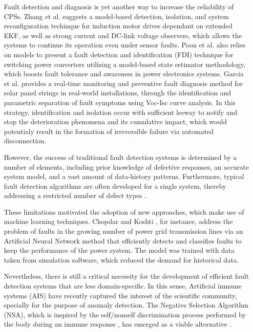 Fault detection and diagnosis is yet another way to increase the reliability of CPSs. Zhang et al. \cite{zhang2013sensor} suggests a model-based detection, isolation, and system reconfiguration techinque for induction motor drives dependant on extended EKF, as well as strong current and DC-link voltage observers, which allows the systems to continue its operation even under sensor faults. Poon et al. \cite{poon2016model} also relies on models to present a fault detection and identification (FDI) technique for switching power converters utilizing a model-based state estimator methodology, which boosts fault tolerance and awareness in power electronics systems. Garcia et al. \cite{garcia2022solar} provides a real-time monitoring and preventive fault diagnosis method for solar panel strings in real-world installations, through the identification and parametric separation of fault symptoms using Voc-Isc curve analysis. In this strategy, identification and isolation occur with sufficient leeway to notify and stop the deterioration phenomena and its cumulative impact, which would potentialy result in the formation of irreversible failure via automated disconnection.

However, the success of traditional fault detection systems is determined by a number of elements, including prior knowledge of defective responses, an accurate system model, and a vast amount of data-history patterns. Furthermore, typical fault detection algorithms are often developed for a single system, thereby addressing a restricted number of defect types \cite{abid2020improved}.

These limitations motivated the adoption of new approaches, which make use of machine learning techniques. Chopdar and Koshti \cite{9848016}, for instance, address the problem of faults in the growing number of power grid transmission lines via an Artificial Neural Network method that efficiently detects and classifies faults to keep the performance of the power system. The model was trained with data taken from simulation software, which reduced the demand for historical data.

Nevertheless, there is still a critical necessity for the development of efficient fault detection systems that are less domain-specific. In this sense, Artificial immune systems (AIS) have recently captured the interest of the scientific community, specially for the purpose of anomaly detection. The Negative Selection Algorithm (NSA), which is inspired by the self/nonself discrimination process performed by the body during an immune response \cite{Kuby2019}, has emerged as a viable alternative \cite{abid2020improved}.

